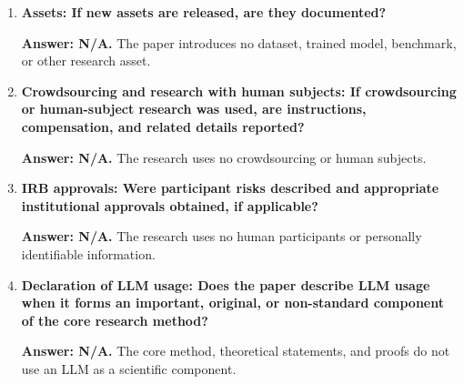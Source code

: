 \begin{enumerate}
\textbf{Answer: N/A.} No data, model, or third-party code asset is used in the scientific results. The manuscript uses the unmodified official NeurIPS 2026 style file for formatting and cites all research on which the analysis builds.

\item \textbf{Assets: If new assets are released, are they documented?}

\textbf{Answer: N/A.} The paper introduces no dataset, trained model, benchmark, or other research asset.

\item \textbf{Crowdsourcing and research with human subjects: If crowdsourcing or human-subject research was used, are instructions, compensation, and related details reported?}

\textbf{Answer: N/A.} The research uses no crowdsourcing or human subjects.

\item \textbf{IRB approvals: Were participant risks described and appropriate institutional approvals obtained, if applicable?}

\textbf{Answer: N/A.} The research uses no human participants or personally identifiable information.

\item \textbf{Declaration of LLM usage: Does the paper describe LLM usage when it forms an important, original, or non-standard component of the core research method?}

\textbf{Answer: N/A.} The core method, theoretical statements, and proofs do not use an LLM as a scientific component.

\end{enumerate}
